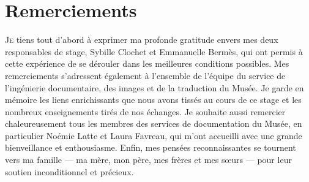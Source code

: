 \documentclass[a4paper,12pt,twoside]{book}
\begin{document}
	\chapter{Remerciements}
	
	\lettrine{J}e tiens tout d'abord à exprimer ma profonde gratitude envers mes deux responsables de stage, Sybille Clochet et Emmanuelle Bermès, qui ont permis à cette expérience de se dérouler dans les meilleures conditions possibles. Mes remerciements s'adressent également à l'ensemble de l'équipe du service de l'ingénierie documentaire, des images et de la traduction du Musée. Je garde en mémoire les liens enrichissants que nous avons tissés au cours de ce stage et les nombreux enseignements tirés de nos échanges. Je souhaite aussi remercier chaleureusement tous les membres des services de documentation du Musée, en particulier Noémie Latte et Laura Favreau, qui m'ont accueilli avec une grande bienveillance et enthousiasme. Enfin, mes pensées reconnaissantes se tournent vers ma famille — ma mère, mon père, mes frères et mes sœurs — pour leur soutien inconditionnel et précieux.
	
	
	
	
	
	\newpage{\pagestyle{empty}\cleardoublepage}
	
\end{document}
